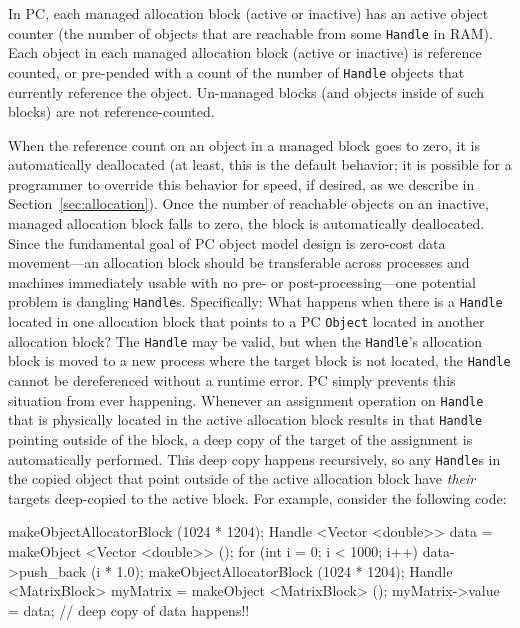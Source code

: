 \vspace{5pt}

In PC, each managed allocation block (active or inactive) has an active object counter (the number of objects that are reachable
from some \texttt{Handle} in RAM).  Each object in each managed allocation block (active or inactive) is reference counted, or pre-pended with a count of
the number of \texttt{Handle} objects that currently reference the object.  
Un-managed blocks (and objects inside of such blocks) are not reference-counted.

When the reference count on an object in a managed block goes to zero, it is automatically
deallocated (at least, this is the default behavior; it is possible
for a programmer to override this behavior for speed, if desired, as
we describe in Section~\ref{sec:allocation}).  
Once the number of reachable objects on an inactive, managed allocation block falls to zero, the block is automatically deallocated.  
Since the fundamental goal of PC object model design is 
zero-cost data movement---an allocation block should be
transferable across processes and machines immediately usable with no pre- or post-processing---one
potential problem is dangling \texttt{Handle}s.  Specifically: What happens when there is a \texttt{Handle} located in one allocation block that points to a PC
\texttt{Object} located in another allocation block?  The \texttt{Handle} may be valid, but when the \texttt{Handle}'s allocation block is moved to a new process where
the target block is not located, the \texttt{Handle} cannot be dereferenced without a runtime error. 
PC simply prevents this situation from ever happening. Whenever an assignment operation on \texttt{Handle} that is physically located
in the active allocation block results in that
\texttt{Handle} pointing outside of the block, a deep copy of the target of the assignment
is automatically performed.  This deep copy happens recursively, so any \texttt{Handle}s in the copied object that point outside of the active allocation block
have \emph{their} targets deep-copied to the active block.  For example, consider the following code:

\begin{codesmall}
makeObjectAllocatorBlock (1024 * 1204);
Handle <Vector <double>> data = 
     makeObject <Vector <double>> ();
for (int i = 0; i < 1000; i++)
     data->push_back (i * 1.0);
makeObjectAllocatorBlock (1024 * 1204); 
Handle <MatrixBlock> myMatrix = 
     makeObject <MatrixBlock> ();
myMatrix->value = data; // deep copy of data happens!!
\end{codesmall}

